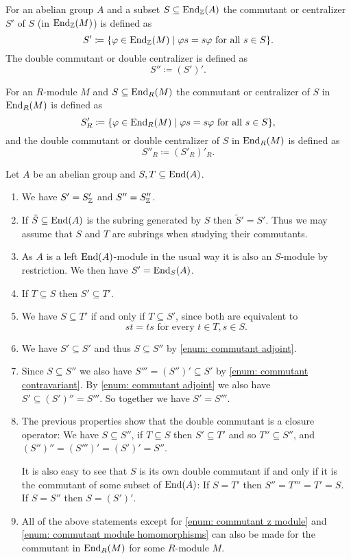 \begin{defi}
 For an abelian group $A$ and a subset $S \subseteq \operatorname{End}_{\mathbb{Z}}(A)$ the commutant or centralizer $S'$ of $S$ (in $\operatorname{End}_{\mathbb{Z}}(M)$) is defined as
 \[
  S' \coloneqq \{ \varphi \in \operatorname{End}_{\mathbb{Z}}(M) \mid \varphi s = s \varphi \text{ for all } s \in S \}.
 \]
 The double commutant or double centralizer is defined as
 \[
  S'' \coloneqq (S')'.
 \]
 
 For an $R$-module $M$ and $S \subseteq \operatorname{End}_R(M)$ the commutant or centralizer of $S$ in $\operatorname{End}_R(M)$ is defined as
 \[
  S'_R \coloneqq \{ \varphi \in \operatorname{End}_R(M) \mid \varphi s = s \varphi \text{ for all } s \in S \},
 \]
 and the double commutant or double centralizer of $S$ in $\operatorname{End}_R(M)$ is defined as
 \[
  S''_R \coloneqq (S'_R)'_R.
 \]
\end{defi}


\begin{rem}
 Let $A$ be an abelian group and $S, T \subseteq \operatorname{End}(A)$.
 \begin{enumerate}[label=\emph{\alph*}),leftmargin=*]
  \item \label{enum: commutant z module}
   We have $S' = S'_{\mathbb{Z}}$ and $S'' = S''_{\mathbb{Z}}$.
  \item
   If $\tilde{S} \subseteq \operatorname{End}(A)$ is the subring generated by $S$ then $\tilde{S}' = S'$. Thus we may assume that $S$ and $T$ are subrings when studying their commutants.
  \item \label{enum: commutant module homomorphisms}
   As $A$ is a left $\operatorname{End}(A)$-module in the usual way it is also an $S$-module by restriction. We then have $S' = \operatorname{End}_S(A)$.
  \item \label{enum: commutant contravariant}
   If $T \subseteq S$ then $S' \subseteq T'$.
  \item \label{enum: commutant adjoint}
   We have $S \subseteq T'$ if and only if $T \subseteq S'$, since both are equivalent to
   \[
    st = ts \text{ for every } t \in T, s \in S.
   \]
  \item
   We have $S' \subseteq S'$ and thus $S \subseteq S''$ by \ref{enum: commutant adjoint}.
  \item
   Since $S \subseteq S''$ we also have $S''' = (S'')' \subseteq S'$ by \ref{enum: commutant contravariant}. By \ref{enum: commutant adjoint} we also have $S' \subseteq (S')'' = S'''$. So together we have $S' = S'''$.
  \item
   The previous properties show that the double commutant is a closure operator: We have $S \subseteq S''$, if $T \subseteq S$ then $S' \subseteq T'$ and so $T'' \subseteq S''$, and $(S'')'' = (S''')' = (S')' = S''$.
   
   It is also easy to see that $S$ is its own double commutant if and only if it is the commutant of some subset of $\operatorname{End}(A)$: If $S = T'$ then $S'' = T''' = T' = S$. If $S = S''$ then $S = (S')'$.
  \item
   All of the above statements except for \ref{enum: commutant z module} and \ref{enum: commutant module homomorphisms} can also be made for the commutant in $\operatorname{End}_R(M)$ for some $R$-module $M$.
 \end{enumerate}
\end{rem}
